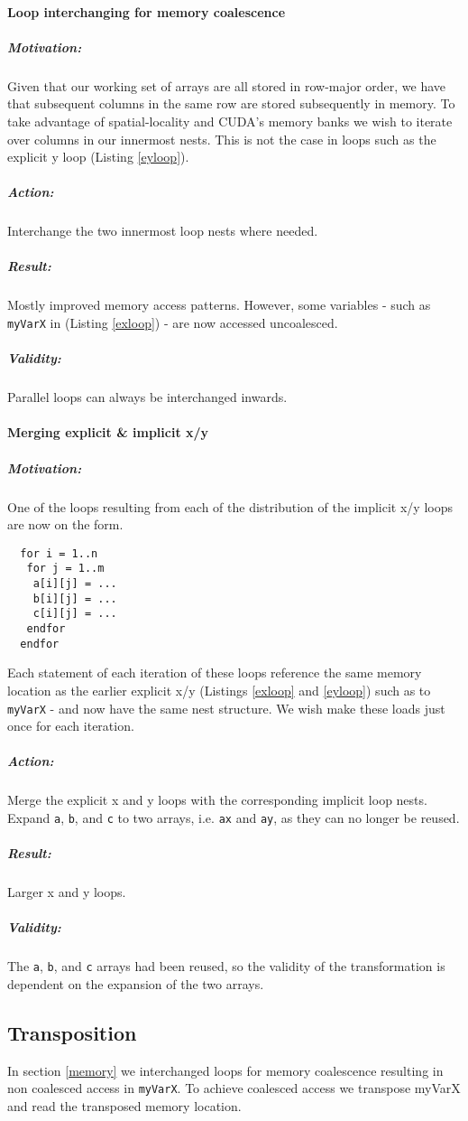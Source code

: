 \paragraph{Loop interchanging for memory coalescence}
\subparagraph{Motivation:} Given that our working set of arrays are all stored in row-major order, we have that subsequent columns in the
 same row are stored subsequently in memory. To take advantage of spatial-locality and CUDA's memory banks we wish to iterate over columns
 in our innermost nests. This is not the case in loops such as the explicit y loop (Listing \ref{eyloop}).
\subparagraph{Action:} Interchange the two innermost loop nests where needed.
\subparagraph{Result:} Mostly improved memory access patterns. However, some variables - such as \verb!myVarX! in (Listing \ref{exloop}) -
 are now accessed uncoalesced.
\subparagraph{Validity:} Parallel loops can always be interchanged inwards.
\paragraph{Merging explicit \& implicit x/y}
\subparagraph{Motivation:} One of the loops resulting from each of the distribution of the implicit x/y loops are now on the form.
\begin{lstlisting}
  for i = 1..n
   for j = 1..m
    a[i][j] = ...
    b[i][j] = ...
    c[i][j] = ...
   endfor
  endfor
\end{lstlisting}
 Each statement of each iteration of these loops reference the same memory location as the earlier explicit x/y
 (Listings \ref{exloop} and \ref{eyloop}) such as to \verb!myVarX! - and now have the same nest structure. We wish make these loads just
 once for each iteration.
\subparagraph{Action:} Merge the explicit x and y loops with the corresponding implicit loop nests. Expand \verb!a!, \verb!b!, and \verb!c!
 to two arrays, i.e. \verb!ax! and \verb!ay!, as they can no longer be reused.
\subparagraph{Result:} Larger x and y loops.
\subparagraph{Validity:} The \verb!a!, \verb!b!, and \verb!c! arrays had been reused, so the validity of the transformation is dependent on
 the expansion of the two arrays.
\subsection{Transposition}
In section \ref{memory} we interchanged loops for memory coalescence resulting in non coalesced access in \verb!myVarX!. To achieve coalesced access we transpose myVarX and read the transposed memory location.

